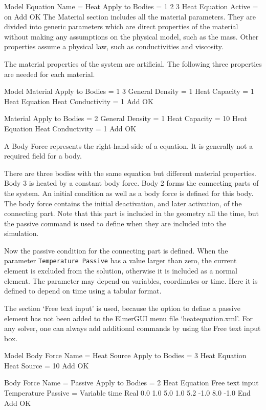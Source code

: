 \ttbegin
Model
  Equation
   Name = Heat
    Apply to Bodies = 1 2 3
    Heat Equation
      Active = on
    Add 
    OK
\ttend        
The Material section includes all the material parameters. They are divided into generic parameters which are direct properties of the material without making any assumptions on the physical model, such as the mass. Other properties assume a physical law, such as conductivities and viscosity. 

The material properties of the system are artificial. The following three properties are needed for each material.

\ttbegin
Model
  Material
    Apply to Bodies = 1 3 
    General 
      Density = 1
      Heat Capacity = 1
    Heat Equation
      Heat Conductivity = 1
    Add
    OK

  Material
    Apply to Bodies = 2
    General 
      Density = 1
      Heat Capacity = 10
    Heat Equation
      Heat Conductivity = 1
    Add
    OK
\ttend

A Body Force represents the right-hand-side of a equation. It is generally not a required field for a body. 

There are three bodies with the same equation but different material properties. Body 3 is heated by a constant body force. Body 2 forms the connecting parts of the system. An initial condition as well as a body force is defined for this body. The body force contains the initial deactivation, and later activation, of the connecting part. Note that this part is included in the geometry all the time, but the passive command is used to define when they are included into the simulation.

Now the passive condition for the connecting part is defined. When the parameter  \texttt{Temperature Passive} has a value larger than zero, the current element is excluded from the solution, otherwise it is included as a normal element. The parameter may depend on variables, coordinates or time. Here it is defined to depend on time using a tabular format.

The section `Free text input' is used, because the option to define a passive element has not been added to the ElmerGUI menu file `heatequation.xml'.  For any solver, one can always add additional commands by using the Free text input box.

\ttbegin
Model
  Body Force
    Name = Heat Source
    Apply to Bodies = 3
    Heat Equation
       Heat Source = 10
    Add 
    OK

  Body Force
    Name = Passive
    Apply to Bodies = 2
    Heat Equation
       Free text input
         Temperature Passive = Variable time
            Real
              0.0     1.0
              5.0     1.0
              5.2    -1.0
              8.0    -1.0
           End
    Add 
    OK
\ttend    

